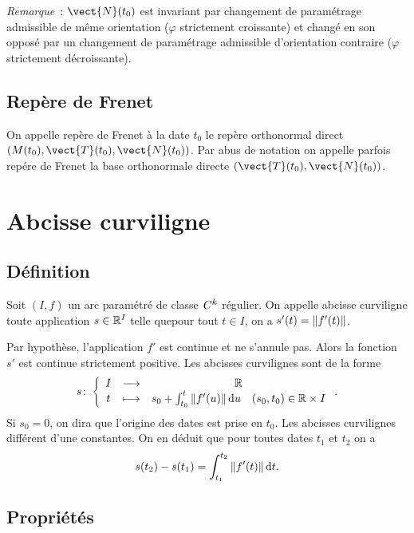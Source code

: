 \emph{Remarque}~: $\vect{N}(t_0)$ est invariant par changement de paramétrage admissible de même orientation ($\varphi$ strictement croissante) et changé en son opposé par un changement de paramétrage admissible d'orientation contraire ($\varphi$ strictement décroissante).

\subsection{Repère de Frenet}

\begin{defdef}
  On appelle repère de Frenet à la date $t_0$ le repère orthonormal direct $(M(t_0), \vect{T}(t_0), \vect{N}(t_0))$. Par abus de notation on appelle parfois repére de Frenet la base orthonormale directe $(\vect{T}(t_0), \vect{N}(t_0))$.
\end{defdef}

\section{Abcisse curviligne}

\subsection{Définition}

\begin{defdef}
  Soit $(I, f)$ un arc paramétré de classe $\mathit{C}^k$ régulier. On appelle abcisse curviligne toute application $s \in \mathbb{R}^I$ telle quepour tout $t \in I$, on a $s'(t)=\left\lVert f'(t)\right\rVert$.
\end{defdef}

Par hypothèse, l'application $f'$ est continue et ne s'annule pas. Alors la fonction $s'$ est continue strictement positive. Les abcisses curvilignes sont de la forme
\begin{equation}
  s\colon \left\{\begin{array}{ccc} I & \longrightarrow &\mathbb{R}\\ t & \longmapsto & s_0 + \int_{t_0}^t \left\lVert f'(u)\right\rVert\mathop{}\mathopen{}\mathrm{d} u \quad (s_0, t_0) \in \mathbb{R} \times I \end{array} \right..
\end{equation}
Si $s_0=0$, on dira que l'origine des dates est prise en $t_0$. Les abcisses curvilignes différent d'une constantes. On en déduit que pour toutes dates $t_1$ et $t_2$ on a
\begin{equation}
  s(t_2)-s(t_1) = \int_{t_1}^{t_2} \left\lVert f'(t)\right\rVert\mathop{}\mathopen{}\mathrm{d} t.
\end{equation}

\subsection{Propriétés}

